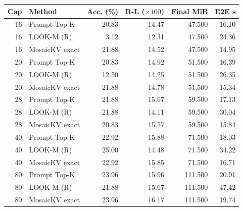 \begin{tabular}{rlrrrr}
\toprule
Cap & Method & Acc. (\%) & R-L ($\times100$) & Final MiB & E2E s\\\midrule
16 & Prompt Top-K & 20.83 & 14.47 & 47.500 & 16.10\\
16 & LOOK-M (R) & 3.12 & 12.31 & 47.500 & 24.36\\
16 & MosaicKV exact & 21.88 & 14.52 & 47.500 & 14.95\\
20 & Prompt Top-K & 20.83 & 14.92 & 51.500 & 16.39\\
20 & LOOK-M (R) & 12.50 & 14.25 & 51.500 & 26.35\\
20 & MosaicKV exact & 21.88 & 14.78 & 51.500 & 15.34\\
28 & Prompt Top-K & 21.88 & 15.67 & 59.500 & 17.13\\
28 & LOOK-M (R) & 21.88 & 14.11 & 59.500 & 30.04\\
28 & MosaicKV exact & 20.83 & 15.57 & 59.500 & 15.84\\
40 & Prompt Top-K & 22.92 & 15.88 & 71.500 & 18.03\\
40 & LOOK-M (R) & 25.00 & 14.48 & 71.500 & 34.22\\
40 & MosaicKV exact & 22.92 & 15.85 & 71.500 & 16.71\\
80 & Prompt Top-K & 23.96 & 15.96 & 111.500 & 20.91\\
80 & LOOK-M (R) & 21.88 & 15.67 & 111.500 & 47.42\\
80 & MosaicKV exact & 23.96 & 16.17 & 111.500 & 19.74\\
\bottomrule
\end{tabular}
